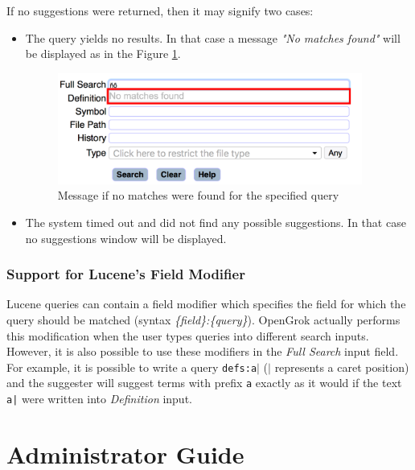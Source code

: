 If no suggestions were returned, then
it may signify two cases:
\begin{itemize}
    \item The query yields no results. In that case a message \textit{"No matches found"} will be displayed as in the
    Figure \ref{no_matches}.
    \begin{figure}[htbp]
        \centering
        \includegraphics[width=100mm]{../img/no_matches.png}
        \caption{Message if no matches were found for the specified query}
        \label{no_matches}
    \end{figure}

    \item The system timed out and did not find any possible suggestions. In that case no suggestions window will be displayed.
\end{itemize}

\subsubsection{Support for Lucene's Field Modifier}
Lucene queries can contain a field modifier which specifies the field for which the query should be matched (syntax \textit{\{field\}:\{query\}}). OpenGrok
actually performs this modification when the user types queries into different search inputs. However, it is also possible
to use these modifiers in the \textit{Full Search} input field. For example, it is possible to write a query
\texttt{defs:a$\vert$} (\texttt{$\vert$} represents a caret position) and the suggester will suggest terms with prefix
\texttt{a} exactly as it would if the text \texttt{a|} were written into \textit{Definition} input.

\section{Administrator Guide}
\label{administrator_guide}

